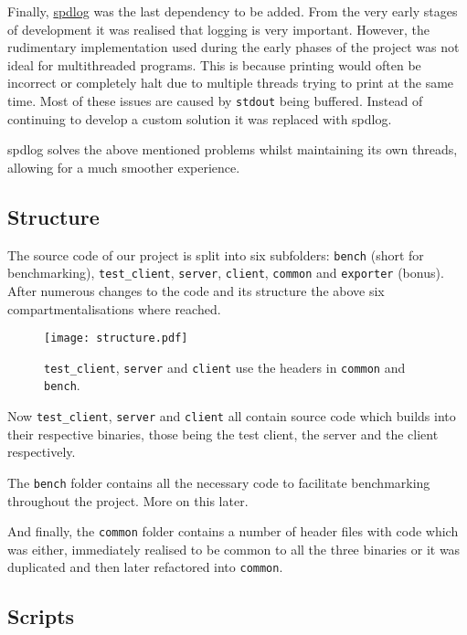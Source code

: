 \documentclass[article]{uom-coursework}
\begin{document}
Finally, \href{https://github.com/gabime/spdlog}{spdlog} was the
last dependency to be added. From the very early stages of
development it was realised that logging is very important.
However, the rudimentary implementation used during the early
phases of the project was not ideal for multithreaded programs.
This is because printing would often be incorrect or completely
halt due to multiple threads trying to print at the same time.
Most of these issues are caused by \texttt{stdout} being
buffered. Instead of continuing to develop a custom solution it
was replaced with spdlog.

spdlog solves the above mentioned problems whilst maintaining
its own threads, allowing for a much smoother experience.

\subsection{Structure}

The source code of our project is split into six subfolders:
\texttt{bench} (short for benchmarking), \texttt{test\_client},
\texttt{server}, \texttt{client}, \texttt{common} and
\texttt{exporter} (bonus). After numerous changes to the code
and its structure the above six compartmentalisations where
reached.

\begin{figure}[H]
\centering
\begin{mdframed}[backgroundcolor=OffWhite]
\texttt{[image: structure.pdf]}
\end{mdframed}
\caption{\texttt{test\_client}, \texttt{server} and
\texttt{client} use the headers in \texttt{common} and
\texttt{bench}.}
\label{fig:folderdeps}
\end{figure}

Now \texttt{test\_client}, \texttt{server} and \texttt{client}
all contain source code which builds into their respective
binaries, those being the test client, the server and the client
respectively.

The \texttt{bench} folder contains all the necessary code to
facilitate benchmarking throughout the project. More on this
later.

And finally, the \texttt{common} folder contains a number of
header files with code which was either, immediately realised to
be common to all the three binaries or it was duplicated and
then later refactored into \texttt{common}.

\subsection{Scripts}
\end{document}
